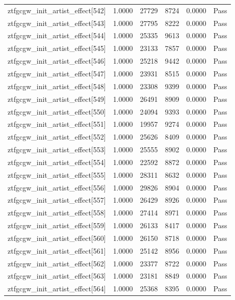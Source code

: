 \begin{table}[htbp]
\begin{tabular}{llrrll}
ztfgcgw\_init\_artist\_effect[542] & 1.0000 & 27729 & 8724 & 0.0000 & Pass \\
ztfgcgw\_init\_artist\_effect[543] & 1.0000 & 27795 & 8222 & 0.0000 & Pass \\
ztfgcgw\_init\_artist\_effect[544] & 1.0000 & 25335 & 9613 & 0.0000 & Pass \\
ztfgcgw\_init\_artist\_effect[545] & 1.0000 & 23133 & 7857 & 0.0000 & Pass \\
ztfgcgw\_init\_artist\_effect[546] & 1.0000 & 25218 & 9442 & 0.0000 & Pass \\
ztfgcgw\_init\_artist\_effect[547] & 1.0000 & 23931 & 8515 & 0.0000 & Pass \\
ztfgcgw\_init\_artist\_effect[548] & 1.0000 & 23308 & 9399 & 0.0000 & Pass \\
ztfgcgw\_init\_artist\_effect[549] & 1.0000 & 26491 & 8909 & 0.0000 & Pass \\
ztfgcgw\_init\_artist\_effect[550] & 1.0000 & 24094 & 9393 & 0.0000 & Pass \\
ztfgcgw\_init\_artist\_effect[551] & 1.0000 & 19957 & 9274 & 0.0000 & Pass \\
ztfgcgw\_init\_artist\_effect[552] & 1.0000 & 25626 & 8409 & 0.0000 & Pass \\
ztfgcgw\_init\_artist\_effect[553] & 1.0000 & 25555 & 8902 & 0.0000 & Pass \\
ztfgcgw\_init\_artist\_effect[554] & 1.0000 & 22592 & 8872 & 0.0000 & Pass \\
ztfgcgw\_init\_artist\_effect[555] & 1.0000 & 28311 & 8632 & 0.0000 & Pass \\
ztfgcgw\_init\_artist\_effect[556] & 1.0000 & 29826 & 8904 & 0.0000 & Pass \\
ztfgcgw\_init\_artist\_effect[557] & 1.0000 & 26429 & 8926 & 0.0000 & Pass \\
ztfgcgw\_init\_artist\_effect[558] & 1.0000 & 27414 & 8971 & 0.0000 & Pass \\
ztfgcgw\_init\_artist\_effect[559] & 1.0000 & 26133 & 8417 & 0.0000 & Pass \\
ztfgcgw\_init\_artist\_effect[560] & 1.0000 & 26150 & 8718 & 0.0000 & Pass \\
ztfgcgw\_init\_artist\_effect[561] & 1.0000 & 25142 & 8956 & 0.0000 & Pass \\
ztfgcgw\_init\_artist\_effect[562] & 1.0000 & 23377 & 8722 & 0.0000 & Pass \\
ztfgcgw\_init\_artist\_effect[563] & 1.0000 & 23181 & 8849 & 0.0000 & Pass \\
ztfgcgw\_init\_artist\_effect[564] & 1.0000 & 25368 & 8395 & 0.0000 & Pass \\

\end{tabular}
\end{table}
